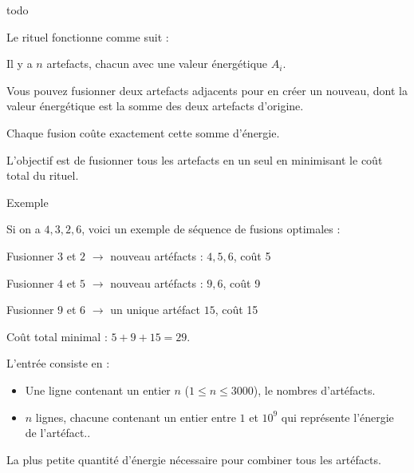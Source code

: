 \problemname{\problemyamlname{}}


todo

Le rituel fonctionne comme suit :

    Il y a $n$ artefacts, chacun avec une valeur énergétique $A_i$.

    Vous pouvez fusionner deux artefacts adjacents pour en créer un nouveau, dont la valeur énergétique est la somme des deux artefacts d'origine.

    Chaque fusion coûte exactement cette somme d'énergie.

    L'objectif est de fusionner tous les artefacts en un seul en minimisant le coût total du rituel.

Exemple

Si on a $4, 3, 2, 6$, voici un exemple de séquence de fusions optimales :

    Fusionner $3$ et $2$ $\rightarrow$ nouveau artéfacts : $4, 5, 6$, coût 5

    Fusionner $4$ et $5$ $\rightarrow$ nouveau artéfacts : $9, 6$, coût 9

    Fusionner $9$ et $6$ $\rightarrow$ un unique artéfact $15$, coût 15

Coût total minimal : $5 + 9 + 15 = 29$.

\begin{Input}
    L'entrée consiste en :
    \begin{itemize}
        \item Une ligne contenant un entier $n$ ($1 \leq n \leq 3000$), le nombres d'artéfacts.
        \item $n$ lignes, chacune contenant un entier entre $1$ et $10^{9}$ qui représente l'énergie de l'artéfact..
    \end{itemize}
\end{Input}

\begin{Output}
    La plus petite quantité d'énergie nécessaire pour combiner tous les artéfacts.
\end{Output}
